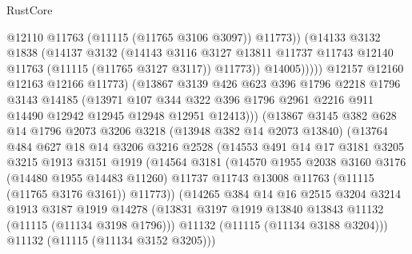 \begin{lexlean}{RustCore}
\begin{coremodule}
                        @12110
                        @11763
                        (@11115 (@11765 @3106 @3097))
                        @11773))
                    (@14133
                      @3132
                      @1838
                      (@14137
                        @3132
                        (@14143
                          @3116
                          @3127
                          @13811
                          @11737
                          @11743
                          @12140
                          @11763
                          (@11115 (@11765 @3127 @3117))
                          @11773))
                      @14005)))))
            @12157
            @12160
            @12163
            @12166
            @11773)
          (@13867
            @3139
            @426
            @623
            @396
            @1796
            @2218
            @1796
            @3143
            @14185
            (@13971
              @107
              @344
              @322
              @396
              @1796
              @2961
              @2216
              @911
              @14490
              @12942
              @12945
              @12948
              @12951
              @12413)))
        (@13867
          @3145
          @382
          @628
          @14
          @1796
          @2073
          @3206
          @3218
          (@13948 @382 @14 @2073 @13840)
          (@13764
            @484
            @627
            @18
            @14
            @3206
            @3216
            @2528
            (@14553
              @491
              @14
              @17
              @3181
              @3205
              @3215
              @1913
              @3151
              @1919
              (@14564
                @3181
                (@14570
                  @1955
                  @2038
                  @3160
                  @3176
                  (@14480 @1955 @14483 @11260)
                  @11737
                  @11743
                  @13008
                  @11763
                  (@11115 (@11765 @3176 @3161))
                  @11773))
              (@14265
                @384
                @14
                @16
                @2515
                @3204
                @3214
                @1913
                @3187
                @1919
                @14278
                (@13831 @3197 @1919 @13840 @13843 @11132 (@11115 (@11134 @3198 @1796)))
                @11132
                (@11115 (@11134 @3188 @3204)))
              @11132
              (@11115 (@11134 @3152 @3205)))

\end{coremodule}
\end{lexlean}
